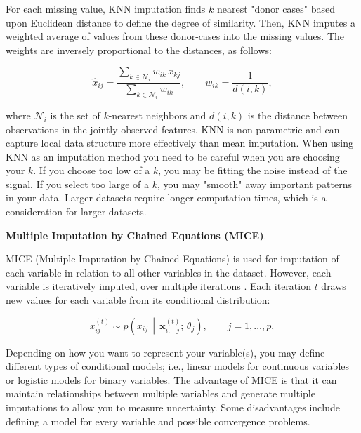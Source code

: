 For each missing value, KNN imputation finds \(k\) nearest "donor cases" based upon Euclidean distance to define the degree of similarity. Then, KNN imputes a weighted average of values from these donor-cases into the missing values. The weights are inversely proportional to the distances, as follows:

\begin{equation}\label{eq:knn}
\hat{x}_{ij}=\frac{\sum_{k\in\mathcal{N}_i}w_{ik}\,x_{kj}}{\sum_{k\in\mathcal{N}_i}w_{ik}},\qquad w_{ik}=\frac{1}{d(i,k)},
\end{equation}

where \(\mathcal{N}_i\) is the set of \(k\)-nearest neighbors and \(d(i,k)\) is the distance between observations in the jointly observed features. KNN is non-parametric and can capture local data structure more effectively than mean imputation. When using KNN as an imputation method you need to be careful when you are choosing your \(k\). If you choose too low of a \(k\), you may be fitting the noise instead of the signal. If you select too large of a \(k\), you may "smooth" away important patterns in your data. Larger datasets require longer computation times, which is a consideration for larger datasets.

\par\medskip
\noindent\textbf{Multiple Imputation by Chained Equations (MICE)}.\par\nobreak

MICE (Multiple Imputation by Chained Equations) is used for imputation of each variable in relation to all other variables in the dataset. However, each variable is iteratively imputed, over multiple iterations \parencite{vanbuuren2011mice}. Each iteration \(t\) draws new values for each variable from its conditional distribution:

\begin{equation}\label{eq:mice}
x_{ij}^{(t)}\sim p\!\left(x_{ij}\,\middle|\,\mathbf{x}_{i,-j}^{(t)};\,\theta_j\right),\qquad j=1,\dots,p,
\end{equation}

Depending on how you want to represent your variable(s), you may define different types of conditional models; i.e., linear models for continuous variables or logistic models for binary variables. The advantage of MICE is that it can maintain relationships between multiple variables and generate multiple imputations to allow you to measure uncertainty. Some disadvantages include defining a model for every variable and possible convergence problems.

